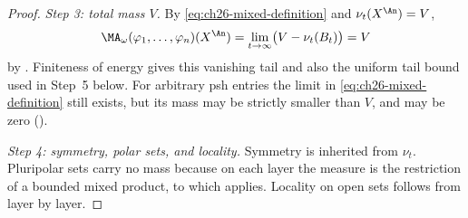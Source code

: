 \begin{proof}
\emph{Step 3: total mass $V$.}  By \eqref{eq:ch26-mixed-definition} and
$\nu_t(X^{\An})=V$,
\[
 \MA_\omega(\varphi_1,\ldots,\varphi_n)(X^{\An})
 =\lim_{t\to\infty}\bigl(V-\nu_t(B_t)\bigr)=V
\]
by . Finiteness of energy gives this vanishing tail and also the uniform tail bound used in Step~5 below. For arbitrary psh entries the limit
in \eqref{eq:ch26-mixed-definition} still exists, but its mass may be
strictly smaller than $V$, and may be zero
().

\emph{Step 4: symmetry, polar sets, and locality.}  Symmetry is inherited
from $\nu_t$.  Pluripolar sets carry no mass because on each layer the
measure is the restriction of a bounded mixed product, to which
 applies.  Locality on open sets follows
from  layer by layer.


\end{proof}
